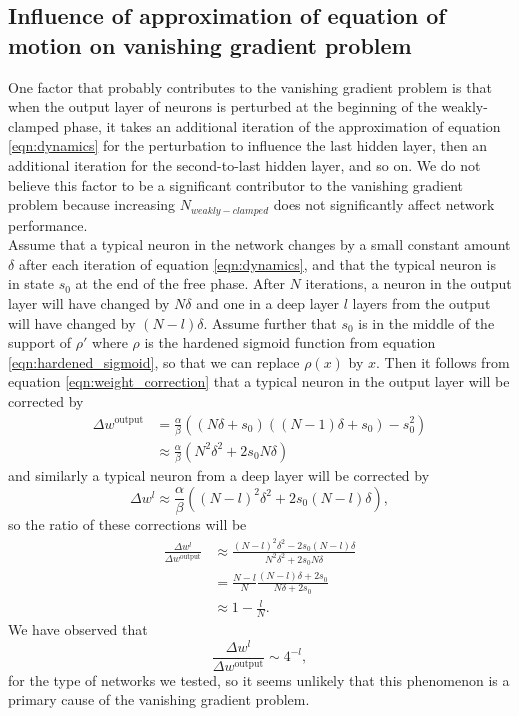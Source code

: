 \documentclass[format=sigconf]{acmart}
\newcommand{\npar}{\\\indent}
\begin{document}
\begin{appendices}
\section{Influence of approximation of equation of motion on vanishing gradient problem}
\label{app:discrete_vangrad}

One factor that probably contributes to the vanishing gradient problem is that when the output layer of neurons is perturbed at the beginning of the weakly-clamped phase, it takes an additional iteration of the approximation of equation \ref{eqn:dynamics} for the perturbation to influence the last hidden layer, then an additional iteration for the second-to-last hidden layer, and so on. We do not believe this factor to be a significant contributor to the vanishing gradient problem because increasing $N_{weakly-clamped}$ does not significantly affect network performance.
\npar
Assume that a typical neuron in the network changes by a small constant amount $\delta$ after each iteration of equation \ref{eqn:dynamics}, and that the typical neuron is in state $s_0$ at the end of the free phase. After $N$ iterations, a neuron in the output layer will have changed by $N\delta$ and one in a deep layer $l$ layers from the output will have changed by $(N-l)\delta$. Assume further that $s_0$ is in the middle of the support of $\rho'$ where $\rho$ is the hardened sigmoid function from equation \ref{eqn:hardened_sigmoid}, so that we can replace $\rho(x)$ by $x$. Then it follows from equation \ref{eqn:weight_correction} that a typical neuron in the output layer will be corrected by 
\begin{equation}
\begin{aligned}
\Delta w^\text{output}&=\frac{\alpha}{\beta}((N\delta + s_0)((N-1)\delta + s_0)-s_0^2)
\\&
\approx \frac{\alpha}{\beta}(N^2\delta^2+2s_0N\delta)
\end{aligned}
\end{equation}
and similarly a typical neuron from a deep layer will be corrected by 
\begin{equation}
\Delta w^l\approx \frac{\alpha}{\beta}((N-l)^2\delta^2+2s_0(N-l)\delta),
\end{equation}
 so the ratio of these corrections will be
\begin{equation}
\begin{aligned}
\frac{\Delta w^l}{\Delta w^{\text{output}}}&\approx \frac{(N-l)^2\delta^2-2s_0(N-l)\delta}{N^2\delta^2+2s_0N\delta}
\\&
=\frac{N-l}{N}\frac{(N-l)\delta+2s_0}{N\delta+2s_0}
\\&
\approx 1-\frac{l}{N}.
\end{aligned}
\end{equation}
We have observed that
\begin{equation}
\frac{\Delta w^l}{\Delta w^{\text{output}}}\sim 4^{-l},
\end{equation}
for the type of networks we tested, so it seems unlikely that this phenomenon is a primary cause of the vanishing gradient problem.



\end{appendices}
\end{document}
